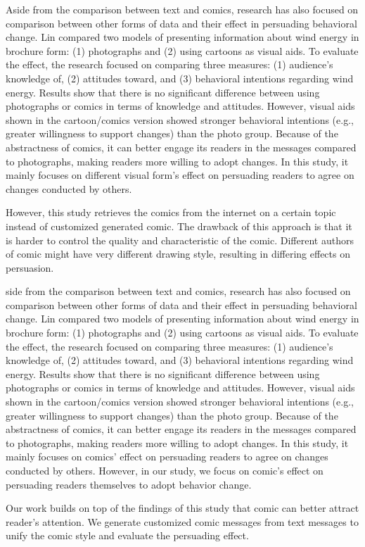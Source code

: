 Aside from the comparison between text and comics, research has also focused on comparison between other forms of data and their effect in persuading behavioral change. Lin \cite{lin2013impact} compared two models of presenting information about wind energy in brochure form: (1) photographs and (2) using cartoons as visual aids. To evaluate the effect, the research focused on comparing three measures: (1) audience's knowledge of, (2) attitudes toward, and (3) behavioral intentions regarding wind energy. Results show that there is no significant difference between using photographs or comics in terms of knowledge and attitudes. However, visual aids shown in the cartoon/comics version showed stronger behavioral intentions (e.g., greater willingness to support changes) than the photo group. Because of the abstractness of comics, it can better engage its readers in the messages compared to photographs, making readers more willing to adopt changes. In this study, it mainly focuses on different visual form's effect on persuading readers to agree on changes conducted by others.

However, this study retrieves the comics from the internet on a certain topic instead of customized generated comic. The drawback of this approach is that it is harder to control the quality and characteristic of the comic. Different authors of comic might have very different drawing style, resulting in differing effects on persuasion.

side from the comparison between text and comics, research has also focused on comparison between other forms of data and their effect in persuading behavioral change. Lin compared two models of presenting information about wind energy in brochure form: (1) photographs and (2) using cartoons as visual aids. To evaluate the effect, the research focused on comparing three measures: (1) audience's knowledge of, (2) attitudes toward, and (3) behavioral intentions regarding wind energy. Results show that there is no significant difference between using photographs or comics in terms of knowledge and attitudes. However, visual aids shown in the cartoon/comics version showed stronger behavioral intentions (e.g., greater willingness to support changes) than the photo group. Because of the abstractness of comics, it can better engage its readers in the messages compared to photographs, making readers more willing to adopt changes. In this study, it mainly focuses on comics' effect on persuading readers to agree on changes conducted by others. However, in our study, we focus on comic's effect on persuading readers themselves to adopt behavior change.\par

Our work builds on top of the findings of this study that comic can better attract reader's attention. We generate customized comic messages from text messages to unify the comic style and evaluate the persuading effect.
